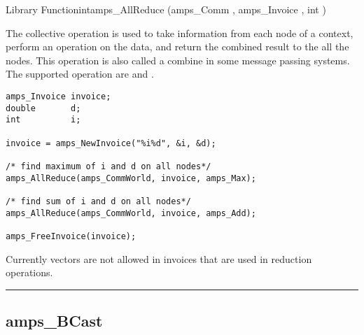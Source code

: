 \begin{deftypefn}{Library Function}{int}{amps\_AllReduce}
(amps_Comm , amps_Invoice , int )

\DESCRIPTION

The collective operation  is used to take information
from each node of a context, perform an operation on the data, and return
the combined result to the all the nodes.  This operation is also called
a combine in some message passing systems.  The supported operation are
 and .

\EXAMPLE

\begin{display}\begin{verbatim}
amps_Invoice invoice;
double       d;
int          i;

invoice = amps_NewInvoice("%i%d", &i, &d);

/* find maximum of i and d on all nodes*/
amps_AllReduce(amps_CommWorld, invoice, amps_Max);

/* find sum of i and d on all nodes*/
amps_AllReduce(amps_CommWorld, invoice, amps_Add);

amps_FreeInvoice(invoice);

\end{verbatim}\end{display}

\NOTES

Currently vectors are not allowed in invoices that are used in reduction
operations.

\end{deftypefn}


\noindent\rule{\textwidth}{1mm}

\subsection{amps\_BCast}
\label{amps_BCast}


